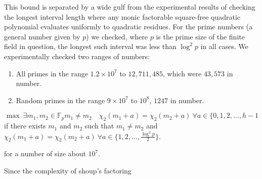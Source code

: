 \documentclass{report}
\begin{document}

This bound is separated by a wide gulf from the experimental results of checking the longest interval length where any monic factorable square-free quadratic polynomial evaluates uniformly to quadratic residues. For the prime numbers (a general number given by $p$) we checked, where $p$ is the prime size of the finite field in question, the longest such interval was less than $\log^2 p$ in all cases. We experimentally checked two ranges of numbers:
\begin{enumerate}
    \item All primes in the range $1.2\times10^7$ to $12,711,485$, which were $43,573$ in number.
    \item Random primes in the range $9\times10^7$ to $10^8$, $1247$ in number.
\end{enumerate}
\[ \max_{}\ \exists m_1,m_2 \in \mathbb{F}_p m_1 \neq m_2 \quad \chi_2(m_1+a)=\chi_2(m_2+a)\ \forall a \in \{0,1,2,\ldots, h-1\]
 if there exists $m_1$ and $m_2$ such that $m_1 \neq m_2$ and $\chi_2(m_1+a)=\chi_2(m_2+a)\ \forall a \in \{1,2,\ldots, \frac{\log^2 p}{2}\}$.

 for a number of size about $10^7$.


Since the complexity of shoup's factoring
\end{document}
